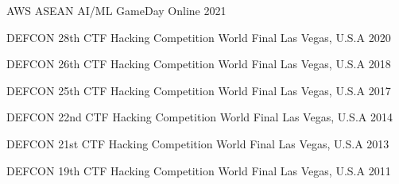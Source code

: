 



\begin{cvhonours}

	{AWS ASEAN AI/ML GameDay} %
	{Online} %
	{2021} %

	{DEFCON 28th CTF Hacking Competition World Final} %
	{Las Vegas, U.S.A} %
	{2020} %

	{DEFCON 26th CTF Hacking Competition World Final} %
	{Las Vegas, U.S.A} %
	{2018} %

	{DEFCON 25th CTF Hacking Competition World Final} %
	{Las Vegas, U.S.A} %
	{2017} %

	{DEFCON 22nd CTF Hacking Competition World Final} %
	{Las Vegas, U.S.A} %
	{2014} %

	{DEFCON 21st CTF Hacking Competition World Final} %
	{Las Vegas, U.S.A} %
	{2013} %

	{DEFCON 19th CTF Hacking Competition World Final} %
	{Las Vegas, U.S.A} %
	{2011} %

\end{cvhonours}




